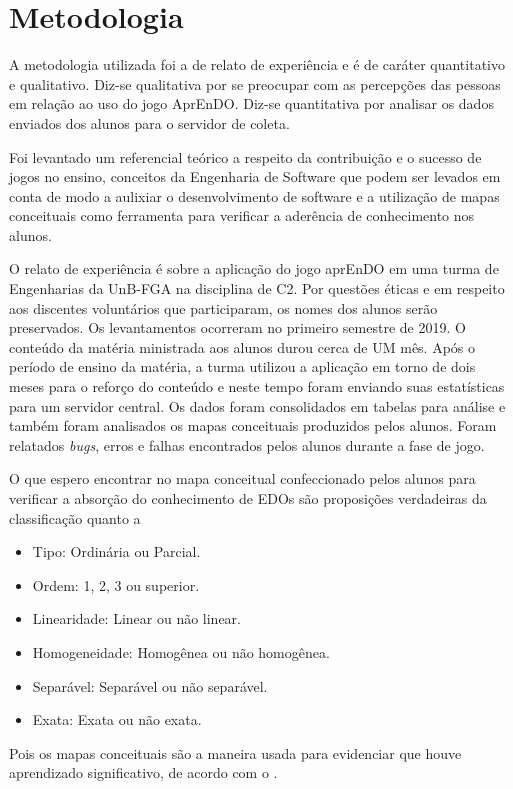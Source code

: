 \chapter[Metodologia]{Metodologia}
A metodologia utilizada foi a de relato de experiência e é de caráter quantitativo e qualitativo. Diz-se qualitativa por se preocupar com as percepções das pessoas em relação ao uso do jogo AprEnDO. Diz-se quantitativa por analisar os dados enviados dos alunos para o servidor de coleta. 

Foi levantado um referencial teórico a respeito da contribuição e o sucesso de jogos no ensino, conceitos da Engenharia de Software que podem ser levados em conta de modo a aulixiar o desenvolvimento de software e a utilização de mapas conceituais como ferramenta para verificar a aderência de conhecimento nos alunos.

O relato de experiência é sobre a aplicação do jogo aprEnDO em uma turma de Engenharias da UnB-FGA na disciplina de C2. Por questões éticas e em respeito aos discentes voluntários que participaram, os nomes dos alunos serão preservados. Os levantamentos ocorreram no primeiro semestre de 2019. O conteúdo da matéria ministrada aos alunos durou cerca de UM mês. Após o período de ensino da matéria, a turma utilizou a aplicação em torno de dois meses para o reforço do conteúdo e neste tempo foram enviando suas estatísticas para um servidor central. Os dados foram consolidados em tabelas para análise e também foram analisados os mapas conceituais produzidos pelos alunos. Foram relatados \textit{bugs}, erros e falhas encontrados pelos alunos durante a fase de jogo. 

O que espero encontrar no mapa conceitual confeccionado pelos alunos para verificar a absorção do conhecimento de EDOs são proposições verdadeiras da classificação quanto a 
\begin{itemize}
\item Tipo: Ordinária ou Parcial.
\item Ordem: 1, 2, 3 ou superior.
\item Linearidade: Linear ou não linear.
\item Homogeneidade: Homogênea ou não homogênea.
\item Separável: Separável ou não separável.
\item Exata: Exata ou não exata.
\end{itemize}

Pois os mapas conceituais são a maneira usada para evidenciar que houve aprendizado significativo, de acordo com o \cite{ausebel}.

